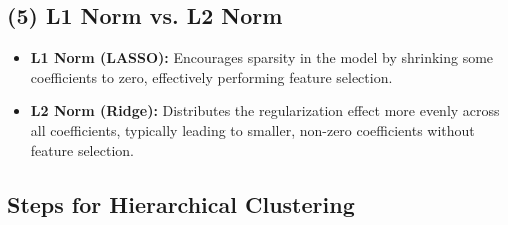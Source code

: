 \documentclass[oneside,solution]{seu-ml-assign}
\begin{document}
\subsection{(5) L1 Norm vs. L2 Norm}
\begin{itemize}
    \item \textbf{L1 Norm (LASSO):} Encourages sparsity in the model by shrinking some coefficients to zero, effectively performing feature selection.
    \item \textbf{L2 Norm (Ridge):} Distributes the regularization effect more evenly across all coefficients, typically leading to smaller, non-zero coefficients without feature selection.
\end{itemize}








\subsection{Steps for Hierarchical Clustering}
\end{document}
